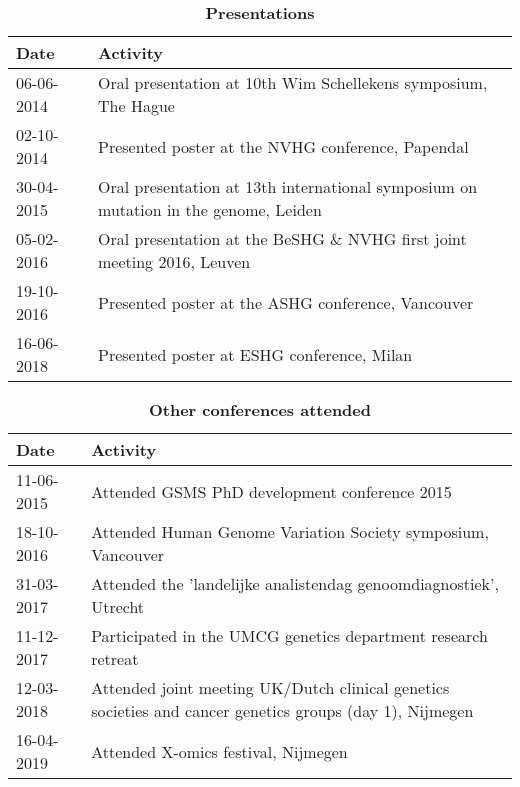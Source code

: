 \begin{appendices}
\begin{table}
	\caption*{\textbf{Presentations}}
	\footnotesize
	\begin{tabulary}{\linewidth}{LL}
		Date & Activity \\
		\hline
			\rule{0pt}{2.6ex}\mbox{06-06-2014 } & Oral presentation at 10th Wim Schellekens symposium, The Hague \\
			\rule{0pt}{2.6ex}\mbox{02-10-2014 } & Presented poster at the NVHG conference, Papendal \\
			\rule{0pt}{2.6ex}\mbox{30-04-2015 } & Oral presentation at 13th international symposium on mutation in the genome, Leiden \\
			\rule{0pt}{2.6ex}\mbox{05-02-2016 } & Oral presentation at the BeSHG \& NVHG first joint meeting 2016, Leuven \\
			\rule{0pt}{2.6ex}\mbox{19-10-2016 } & Presented poster at the ASHG conference, Vancouver\\
			\rule{0pt}{2.6ex}\mbox{16-06-2018 } & Presented poster at ESHG conference, Milan \\
			\hline
\end{tabulary}
\label{table:appendix_activities_2}
\end{table}

\clearpage



\begin{table}
	\caption*{\textbf{Other conferences attended}}
	\footnotesize
	\begin{tabulary}{\linewidth}{LL}
		Date & Activity \\
		\hline
		\rule{0pt}{2.6ex}\mbox{11-06-2015  } & Attended GSMS PhD development conference 2015 \\
		\rule{0pt}{2.6ex}\mbox{18-10-2016  } & Attended Human Genome Variation Society symposium, Vancouver \\
		\rule{0pt}{2.6ex}\mbox{31-03-2017  } & Attended the 'landelijke analistendag genoomdiagnostiek', Utrecht \\
		\rule{0pt}{2.6ex}\mbox{11-12-2017  } & Participated in the UMCG genetics department research retreat \\
		\rule{0pt}{2.6ex}\mbox{12-03-2018  } & Attended joint meeting UK/Dutch clinical genetics societies and cancer genetics groups (day 1), Nijmegen \\
		\rule{0pt}{2.6ex}\mbox{16-04-2019  } & Attended X-omics festival, Nijmegen \\
		\hline
	\end{tabulary}
	\label{table:appendix_activities_3}
\end{table}




\end{appendices}

